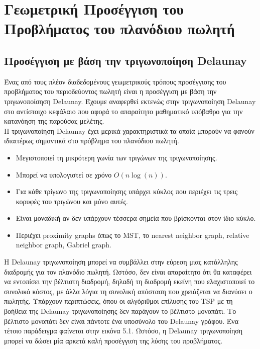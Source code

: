 \documentclass[oneside,12pt]{book}
\theoremstyle{definition}
\begin{document}
\chapter{Γεωμετρική Προσέγγιση του Προβλήματος του πλανόδιου πωλητή}

\section{Προσέγγιση με βάση την τριγωνοποίηση Delaunay}

Ένας από τους πλέον διαδεδομένους γεωμετρικούς τρόπους προσέγγισης του προβλήματος του περιοδεύοντος πωλητή είναι η προσέγγιση με βάση την τριγωνοποίσηση Delaunay. Έχουμε αναφερθεί εκτενώς στην τριγωνοποίηση Delaunay στο αντίστοιχο κεφάλαιο που αφορά το απαραίτητο μαθηματικό υπόβαθρο για την κατανόηση της παρούσας μελέτης. \\

Η τριγωνοποίηση Delaunay έχει μερικά χαρακτηριστικά τα οποία μπορούν να φανούν ιδιαιτέρως σημαντικά στο πρόβλημα του πλανόδιου πωλητή. 

\begin{itemize}
	\item Μεγιστοποιεί τη μικρότερη γωνία των τριγώνων της τριγωνοποίησης.
	\item Μπορεί να υπολογιστεί σε χρόνο \(Ο(n \log(n))\).
	\item Για κάθε τρίγωνο της τριγωνοποίησης υπάρχει κύκλος που περιέχει τις τρεις κορυφές του τριγώνου και μόνο αυτές.
	\item Είναι μοναδική αν δεν υπάρχουν τέσσερα σημεία που βρίσκονται στον ίδιο κύκλο.
	\item Περιέχει proximity graphs όπως το MST, το nearest neighbor graph, relative neighbor graph, Gabriel graph.
\end{itemize}

Η Delaunay τριγωνοποίηση μπορεί να συμβάλλει στην εύρεση μιας κατάλληλης διαδρομής για τον πλανόδιο πωλητή. Ωστόσο, δεν είναι απαραίτητο ότι θα καταφέρει να εντοπίσει την βέλτιστη διαδρομή, δηλαδή τη διαδρομή εκείνη που ελαχιστοποιεί το συνολικό κόστος, με άλλα λόγια τη συνολική απόσταση που χρειάζεται να διανύσει ο πωλητής. Υπάρχουν περιπτώσεις, όπου οι αλγόριθμοι επίλυσης του TSP με τη βοήθεια της Delaunay τριγωνοποίησης δεν παράγουν το βέλτιστο μονοπάτι. Το βέλτιστο μονοπάτι δεν είναι πάντοτε ένα υποσύνολο του Delaunay γράφου. Ένα τέτοιο παράδειγμα φαίνεται στην εικόνα 5.1. Ωστόσο, η Delaunay τριγωνοποίηση μπορεί να δώσει μία αρκετά καλή προσέγγιση της λύσης του προβλήματος. \\
\end{document}
